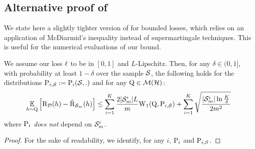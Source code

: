 \begin{noaddcontents}
    
    \subsection{Alternative proof of }
    \label{sec:alt-proof-supervised}
    
    
    We state here a slightly tighter version of  for bounded losses, which relies on an application of McDiarmid's inequality instead of supermartingale techniques.
    This is useful for the numerical evaluations of our bound.
    
    \begin{theorem}\label{theorem:supervised_tight}
    We assume our loss $\loss$ to be in $[0,1]$ and $L$-Lipschitz.
    Then, for any $\delta\in(0,1]$, with probability at least $1-\delta$ over the sample $\S$, the following holds for the distributions $\P_{i,\S}\defeq \P_i(\S,.)$ and for any $\Q\in\Mcal(\H)$:
    \begin{align*}
    \ \EE_{h\sim\Q}\Big[ \Risk_{\D}(h) - \Riskhat_{\Sm}(h) \Big] \le \sum_{i=1}^{K} \frac{2|\Sm^{i}|L}{m} \W_{1}(\Q, \P_{i,\S}) + \sum_{i=1}^{K} \sqrt{\frac{|\Sm^{i}|\ln\frac{K}{\delta}}{2m^2}} 
    \end{align*}
    where $\P_i$ {\it does not} depend on $\Sm^{i}$.
    \end{theorem}
    \begin{proof}
    For the sake of readability, we identify, for any $i$, $\P_i $ and $\P_{i,\S}$.
    

\end{proof}
\end{noaddcontents}
